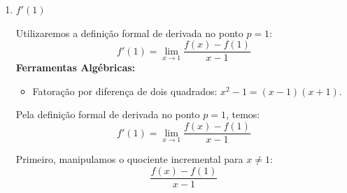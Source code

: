 \begin{enumerate}[label=\alph*)]
    Pela definição formal de derivada no ponto $p = 0$, temos:
    \begin{equation}
        f'(0) = \lim_{x \to 0} \frac{f(x) - f(0)}{x - 0} \label{eq:def_derivada_ponto0}
    \end{equation}

    Primeiro, manipulamos o quociente incremental para $x \neq 0$:
    \begin{equation}
        \frac{f(x) - f(0)}{x - 0} \label{eq:quociente_ponto0}
    \end{equation}

    Sendo $f(x) = x^2 + 1$, calculamos o valor da função em $p = 0$:
    \[
    f(0) = 0^2 + 1 = 1
    \]

    Substituindo $f(x)$ e $f(0)$ em \eqref{eq:quociente_ponto0}:
    \begin{align*}
        \frac{f(x) - f(0)}{x - 0} &= \frac{(x^2 + 1) - 1}{x} \\[0.25cm]
        &= \frac{x^2}{x} \\[0.25cm]
        &= x
    \end{align*}

    Daí, aplicando o limite em \eqref{eq:def_derivada_ponto0} quando $x \to 0$:
    \[
    f'(0) = \lim_{x \to 0} x = 0
    \]

    Portanto:
    \[
    f'(0) = 0 \qedsymbolmath
    \]

    \item $f'(1)$
    \setcounter{equation}{0}

    \begin{recursosbox}[title=Recursos Utilizados]
    Utilizaremos a definição formal de derivada no ponto $p = 1$:
    \[
    f'(1) = \lim_{x \to 1} \frac{f(x) - f(1)}{x - 1}
    \]
    \textbf{Ferramentas Algébricas:}
    \begin{itemize}[noitemsep, topsep=2pt]
        \item Fatoração por diferença de dois quadrados: $x^2 - 1 = (x - 1)(x + 1)$.
    \end{itemize}
    \end{recursosbox}

    Pela definição formal de derivada no ponto $p = 1$, temos:
    \begin{equation}
        f'(1) = \lim_{x \to 1} \frac{f(x) - f(1)}{x - 1} \label{eq:def_derivada_ponto1}
    \end{equation}

    Primeiro, manipulamos o quociente incremental para $x \neq 1$:
    \begin{equation}
        \frac{f(x) - f(1)}{x - 1} \label{eq:quociente_ponto1}
    \end{equation}


\end{enumerate}

